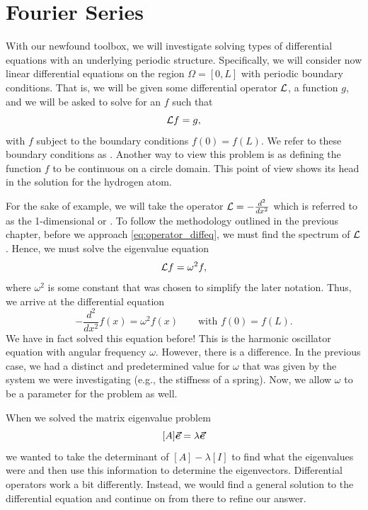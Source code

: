 \section{Fourier Series}

With our newfound toolbox, we will investigate solving types of differential equations with an underlying periodic structure.  Specifically, we will consider now linear differential equations on the region $\Omega = [0,L]$ with periodic boundary conditions.  That is, we will be given some differential operator $\mathcal{L}$, a function $g$, and we will be asked to solve for an $f$ such that
\begin{equation}
\label{eq:operator_diffeq}
\mathcal{L} f = g,
\end{equation}
with $f$ subject to the boundary conditions $f(0)=f(L)$.  We refer to these boundary conditions as .  Another way to view this problem is as defining the function $f$ to be continuous on a circle domain.  This point of view shows its head in the solution for the hydrogen atom.

For the sake of example, we will take the operator $\mathcal{L} = -\frac{d^2}{dx^2}$ which is referred to as the 1-dimensional  or .  To follow the methodology outlined in the previous chapter, before we approach \ref{eq:operator_diffeq}, we must find the spectrum of $\mathcal{L}$.  Hence, we must solve the eigenvalue equation
\[
\mathcal{L} f = \omega^2 f,
\]
where $\omega^2$ is some constant that was chosen to simplify the later notation.  Thus, we arrive at the differential equation
\begin{equation}
\label{eq:harmonic_osc_operator}
-\frac{d^2}{dx^2}f(x) = \omega^2 f(x) \qquad\textrm{with~} f(0)=f(L).
\end{equation}
We have in fact solved this equation before! This is the harmonic oscillator equation with angular frequency $\omega$.  However, there is a difference.  In the previous case, we had a distinct and predetermined value for $\omega$ that was given by the system we were investigating (e.g., the stiffness of a spring).  Now, we allow $\omega$ to be a parameter for the problem as well.  

When we solved the matrix eigenvalue problem
\[
[A]\boldsymbol{\vec{e}} = \lambda \boldsymbol{\vec{e}}
\]
we wanted to take the determinant of $[A]-\lambda [I]$ to find what the eigenvalues were and then use this information to determine the eigenvectors.  Differential operators work a bit differently. Instead, we would find a general solution to the differential equation and continue on from there to refine our answer.

